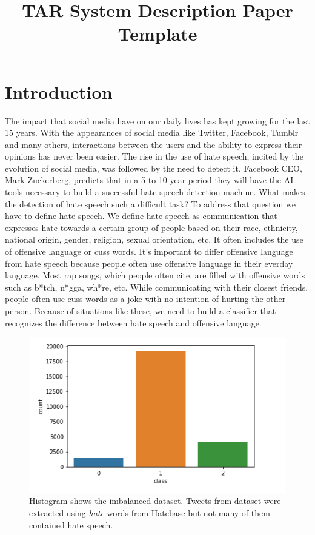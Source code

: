 \documentclass[10pt, a4paper]{article}
\title{TAR System Description Paper Template}
\begin{document}
\maketitleabstract

\section{Introduction}

The impact that social media have on our daily lives has kept growing for the last 15 years. With the appearances of social media like Twitter, Facebook, Tumblr and many others, interactions between the users and the ability to express their opinions has never been easier. The rise in the use of hate speech, incited by the evolution of social media, was followed by the need to detect it. Facebook CEO, Mark Zuckerberg, predicts that in a 5 to 10 year period they will have the AI tools necessary to build a successful hate speech detection machine. What makes the detection of hate speech such a difficult task? To address that question we have to define hate speech. We define hate speech as communication that expresses hate towards a certain group of people based on their race, ethnicity, national origin, gender, religion, sexual orientation, etc. It often includes the use of offensive language or cuss words. It's important to differ offensive language from hate speech because people often use offensive language in their everday language. Most rap songs, which people often cite, are filled with offensive words such as b*tch, n*gga, wh*re, etc. While communicating with their closest friends, people often use cuss words as a joke with no intention of hurting the other person. Because of situations like these, we need to build a classifier that recognizes the difference between hate speech and offensive language. 

\begin{figure}[h]
	\includegraphics[width=1.1\linewidth, height=0.25\textheight]{pictures/HistOfData}
	\caption[Histogram showing number of labeled classes]{Histogram shows the imbalanced dataset. Tweets from dataset were extracted using \textit{hate} words from Hatebase but not many of them contained hate speech.}
	\label{fig:histofdata}
\end{figure}
\end{document}
